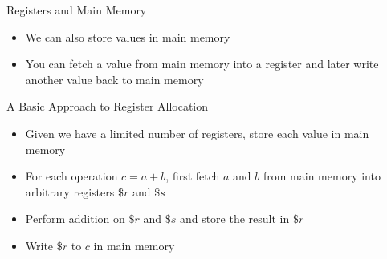\documentclass[aspectratio=169]{beamer}
\begin{document}
\begin{frame}{Registers and Main Memory}
    \begin{itemize}
        \item We can also store values in main memory
        \item You can fetch a value from main memory into a register and later write another value back to main memory
    \end{itemize}
\end{frame}

\begin{frame}{A Basic Approach to Register Allocation}
    \begin{itemize}
        \item Given we have a limited number of registers, store each value in main memory
        \pause
        \item For each operation $c = a + b$, first fetch $a$ and $b$ from main memory into arbitrary registers $\$r$ and $\$s$
        \pause
        \item Perform addition on $\$r$ and $\$s$ and store the result in $\$r$
        \pause
        \item Write $\$r$ to $c$ in main memory
    \end{itemize}
\end{frame}
\end{document}

